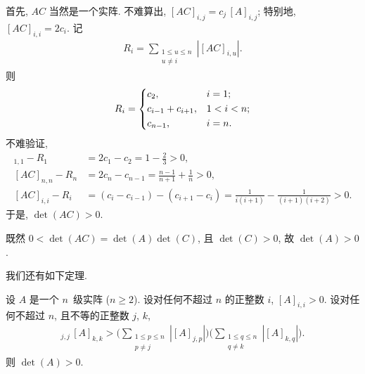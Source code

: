 \documentclass[../libro.tex]{subfiles}
\begin{document}
\begin{example}[continues=emp:NonzeroDet3]
    首先, \(AC\) 当然是一个实阵.
    不难算出, \([AC]_{i,j} = c_j\, [A]_{i,j}\);
    特别地, \([AC]_{i,i} = 2c_i\).
    记
    \begin{align*}
        R_i = \sum_{\substack{1 \leq u \leq n \\ u \neq i}}
        {|[AC]_{i,u}|}.
    \end{align*}
    则
    \begin{align*}
        R_i =
        \begin{dcases}
            c_2,               & i = 1;     \\
            c_{i-1} + c_{i+1}, & 1 < i < n; \\
            c_{n-1},           & i = n.
        \end{dcases}
    \end{align*}
    不难验证,
    \begin{align*}
        [AC]_{1,1} - R_1
        & = 2c_1 - c_2
        = 1 - \frac{2}{3} > 0, \\
        [AC]_{n,n} - R_n
        & = 2c_n - c_{n-1}
        = \frac{n-1}{n+1} + \frac{1}{n} > 0, \\
        [AC]_{i,i} - R_i
        & = (c_i - c_{i-1}) - (c_{i+1} - c_i)
        = \frac{1}{i(i+1)} - \frac{1}{(i+1)(i+2)} > 0.
    \end{align*}
    于是, \(\det {(AC)} > 0\).

    既然 \(0 < \det {(AC)} = \det {(A)} \det {(C)}\),
    且 \(\det {(C)} > 0\),
    故 \(\det {(A)} > 0\).
\end{example}

我们还有如下定理.

\begin{theorem}
    设 \(A\) 是一个 \(n\)~级实阵 (\(n \geq 2\)).
    设对任何不超过 \(n\) 的正整数 \(i\),
    \([A]_{i,i} > 0\).
    设对任何不超过 \(n\), 且不等的正整数 \(j\), \(k\),
    \begin{align*}
        [A]_{j,j}\,[A]_{k,k} >
        \Bigg(
            \sum_{\substack{1 \leq p \leq n \\
            p \neq j}} {|[A]_{j,p}|}
        \Bigg)
        \Bigg(
            \sum_{\substack{1 \leq q \leq n \\
            q \neq k}} {|[A]_{k,q}|}
        \Bigg).
    \end{align*}
    则 \(\det {(A)} > 0\).
\end{theorem}
\end{document}
